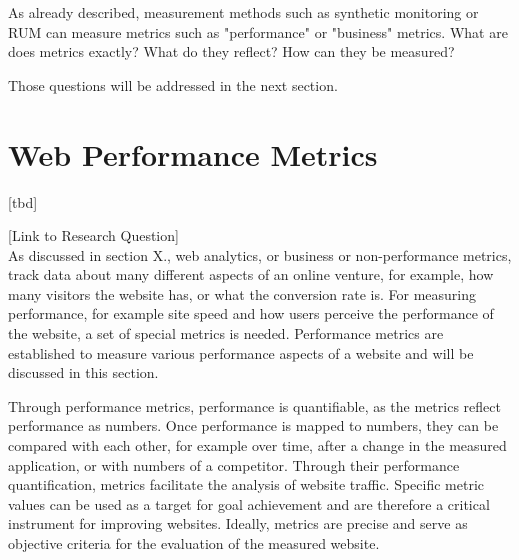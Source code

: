 As already described, measurement methods such as synthetic monitoring or RUM can measure metrics such as "performance" or "business" metrics.
What are does metrics exactly?
What do they reflect?
How can they be measured?

Those questions will be addressed in the next section.








\section{Web Performance Metrics}
\label{section:web_performance_metrics}

[tbd]

[Link to Research Question] \\




As discussed in section X., web analytics, or business or non-performance metrics, track data about many different aspects of an online venture, for example, how many visitors the website has, or what the conversion rate is.
For measuring performance, for example site speed and how users perceive the performance of the website, a set of special metrics is needed.
Performance metrics are established to measure various performance aspects of a website and will be discussed in this section.



Through performance metrics, performance is quantifiable, as the metrics reflect performance as numbers.
Once performance is mapped to numbers, they can be compared with each other, for example over time, after a change in the measured application,  or with numbers of a competitor. %
Through their performance quantification, metrics facilitate the analysis of website traffic.
Specific metric values can be used as a target for goal achievement and are therefore a critical instrument for improving websites. %
Ideally, metrics are precise and serve as objective criteria for the evaluation of the measured website. %


